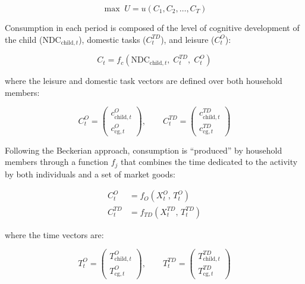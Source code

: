 \documentclass[12pt]{article}
\newcommand{\NDC}{\mathrm{NDC}}
\newcommand{\child}{\text{child}}
\newcommand{\cg}{\text{cg}}   %
\begin{document}
\begin{equation}
  \max \; U = u(C_1, C_2, \ldots, C_T)
  \tag{A.1}
  \label{appeq:utility}
\end{equation}

Consumption in each period is composed of the level of cognitive development
of the child ($\NDC_{\child,t}$), domestic tasks ($C_t^{TD}$), and leisure
($C_t^{O}$):

\begin{equation}
  C_t = f_c\!\left(\NDC_{\child,t},\; C_t^{TD},\; C_t^{O}\right)
  \tag{A.2}
  \label{appeq:comp}
\end{equation}

where the leisure and domestic task vectors are defined over both household
members:

\begin{equation}
  C_t^{O} = \begin{pmatrix} c_{\child,t}^{O} \\ c_{\cg,t}^{O} \end{pmatrix},
  \qquad
  C_t^{TD} = \begin{pmatrix} c_{\child,t}^{TD} \\ c_{\cg,t}^{TD} \end{pmatrix}
  \tag{A.3}
  \label{appeq:vectors}
\end{equation}

Following the Beckerian approach, consumption is ``produced'' by household
members through a function $f_j$ that combines the time dedicated to the
activity by both individuals and a set of market goods:

\begin{align}
  C_t^{O}  &= f_{O}\!\left(X_t^{O},\, T_t^{O}\right)
  \tag{A.4}
  \label{appeq:leisure} \\
  C_t^{TD} &= f_{TD}\!\left(X_t^{TD},\, T_t^{TD}\right)
  \tag{A.5}
  \label{appeq:domestic}
\end{align}

where the time vectors are:

\begin{equation}
  T_t^{O} = \begin{pmatrix} T_{\child,t}^{O} \\ T_{\cg,t}^{O} \end{pmatrix},
  \qquad
  T_t^{TD} = \begin{pmatrix} T_{\child,t}^{TD} \\ T_{\cg,t}^{TD} \end{pmatrix}
  \tag{A.6}
  \label{appeq:timevecs}
\end{equation}
\end{document}
